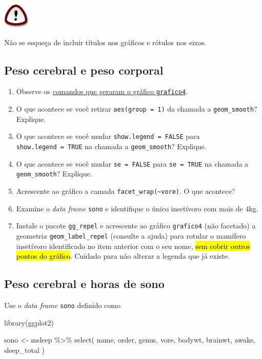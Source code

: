 \documentclass[
  11pt]{report}
\newenvironment{Shaded}{\begin{snugshade}}{\end{snugshade}}
\newcommand{\FunctionTok}[1]{\textcolor[rgb]{0.00,0.00,0.00}{#1}}
\newcommand{\NormalTok}[1]{#1}
\newcommand{\OtherTok}[1]{\textcolor[rgb]{0.56,0.35,0.01}{#1}}
\newcommand{\SpecialCharTok}[1]{\textcolor[rgb]{0.00,0.00,0.00}{#1}}
\newenvironment{rmdimportant}
{
  \begin{myimportant}
    \includegraphics{images/important.png}
    \tcblower
  }
  {
  \end{myimportant}
}
\renewenvironment{Shaded}{
    \begin{mdframed}[%
      roundcorner=2pt,%
      innerleftmargin=5pt,%
      innerrightmargin=5pt,%
      topline=true,%
      leftline=true,%
      rightline=true,%
      bottomline=true,%
      linewidth=0.5pt,%
      linecolor=black!20,%
      backgroundcolor=black!2,%
      skipabove=2ex,%
      skipbelow=2.5ex%
    ]%
  }
  {
    \end{mdframed}
  }
\begin{document}
\begin{rmdimportant}
Não se esqueça de incluir títulos nos gráficos e rótulos nos eixos.

\end{rmdimportant}

\hypertarget{peso-cerebral-e-peso-corporal}{%
\subsection{Peso cerebral e peso corporal}\label{peso-cerebral-e-peso-corporal}}

\begin{enumerate}
\def\labelenumi{\arabic{enumi}.}
\item
  Observe os \protect\hyperlink{grafico4}{comandos que geraram o gráfico \texttt{grafico4}}.
\item
  O que acontece se você retirar \texttt{aes(group\ =\ 1)} da chamada a \texttt{geom\_smooth}? Explique.
\item
  O que acontece se você mudar \texttt{show.legend\ =\ FALSE} para \texttt{show.legend\ =\ TRUE} na chamada a \texttt{geom\_smooth}? Explique.
\item
  O que acontece se você mudar \texttt{se\ =\ FALSE} para \texttt{se\ =\ TRUE} na chamada a \texttt{geom\_smooth}? Explique.
\item
  Acrescente ao gráfico a camada \texttt{facet\_wrap(\textasciitilde{}vore)}. O que acontece?
\item
  Examine o \emph{data frame} \texttt{sono} e identifique o único insetívoro com mais de $4$kg.
\item
  Instale o pacote \texttt{gg\_repel} e acrescente ao gráfico \texttt{grafico4} (não facetado) a geometria \texttt{geom\_label\_repel} (consulte a ajuda) para rotular o mamífero insetívoro identificado no item anterior com o seu nome, {\hl{sem cobrir outros pontos do gráfico}}. Cuidado para não alterar a legenda que já existe.
\end{enumerate}

\hypertarget{peso-cerebral-e-horas-de-sono}{%
\subsection{Peso cerebral e horas de sono}\label{peso-cerebral-e-horas-de-sono}}

\begin{rmdbox}

Use o \emph{data frame} \texttt{sono} definido como

\begin{Shaded}
\begin{Highlighting}[]
\FunctionTok{library}\NormalTok{(ggplot2)}

\NormalTok{sono }\OtherTok{\textless{}{-}}\NormalTok{ msleep }\SpecialCharTok{\%\textgreater{}\%} 
  \FunctionTok{select}\NormalTok{(}
\NormalTok{    name, order, genus, vore, bodywt, }
\NormalTok{    brainwt, awake, sleep\_total}
\NormalTok{  )}
\end{Highlighting}
\end{Shaded}

\end{rmdbox}
\end{document}
